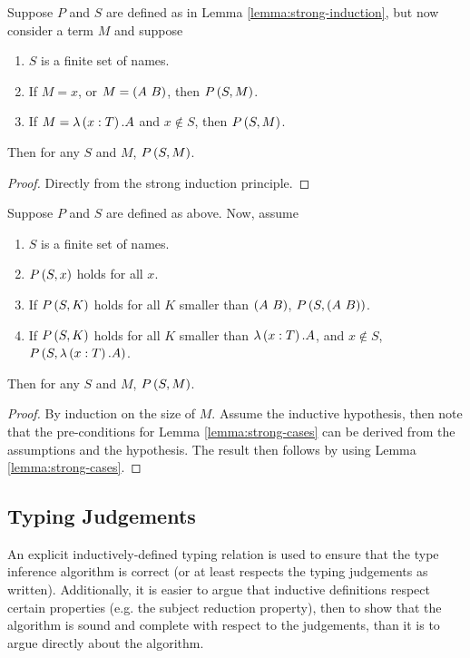 \begin{lemma}
\label{lemma:strong-cases}
Suppose \(P\) and \(S\) are defined as in Lemma \ref{lemma:strong-induction}, but now consider a term \(M\) and suppose
\begin{enumerate}
\item
\(S\) is a finite set of names.
\item
If \(M = x\), or \(M = \left(A\ B\right)\), then \(P\left(S, M\right)\).
\item
If \(M = \lambda \left(x:T\right). A\) and \(x \notin S\), then \(P\left(S, M\right)\).
\end{enumerate}
Then for any \(S\) and \(M\), \(P\left(S, M\right)\).
\end{lemma}
\begin{proof}
Directly from the strong induction principle.
\end{proof}

\begin{lemma}
Suppose \(P\) and \(S\) are defined as above.
Now, assume
\begin{enumerate}
\item
\(S\) is a finite set of names.
\item
\(P\left(S, x\right)\) holds for all \(x\).
\item
If \(P\left(S, K\right)\) holds for all \(K\) smaller than \(\left(A\ B\right)\), \(P\left(S, \left(A\ B\right)\right)\).
\item
If \(P\left(S, K\right)\) holds for all \(K\) smaller than \(\lambda \left(x:T\right). A\), and \(x \notin S\), \(P\left(S, \lambda \left(x:T\right).A\right)\).
\end{enumerate}
Then for any \(S\) and \(M\), \(P\left(S, M\right)\).
\end{lemma}
\begin{proof}
By induction on the size of \(M\).
Assume the inductive hypothesis, then note that the pre-conditions for Lemma \ref{lemma:strong-cases} can be derived from the assumptions and the hypothesis.
The result then follows by using Lemma \ref{lemma:strong-cases}.
\end{proof}

\subsection{Typing Judgements}
\label{sec:typing-judgements}
An explicit inductively-defined typing relation is used to ensure that the type inference algorithm is correct (or at least respects the typing judgements as written).
Additionally, it is easier to argue that inductive definitions respect certain properties (e.g. the subject reduction property), then to show that the algorithm is sound and complete with respect to the judgements, than it is to argue directly about the algorithm.

